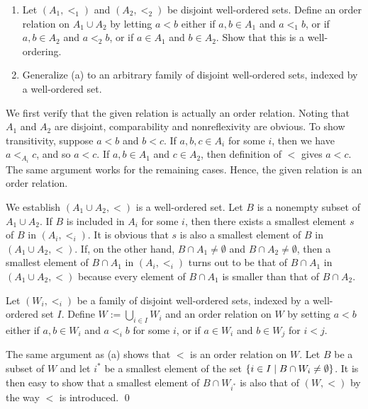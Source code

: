 \documentclass[a4paper,12pt]{article}
\begin{document}
\begin{exe}\leavevmode
	\begin{enumerate}
		\item
		      Let \( (A_1,<_{1}) \) and \( (A_2,<_2) \) be disjoint well-ordered sets.
		      Define an order relation on \( A_1 \cup A_2 \) by letting
		      \( a<b \)
		      either if \( a,b \in A_1 \)
		      and \( a<_1 b \),
		      or if \( a,b \in A_2 \)
		      and \( a<_2 b \),
		      or if \( a \in A_1 \) and \( b \in A_2 \).
		      Show that this is a well-ordering.
		      
		\item
		      Generalize (a) to an arbitrary family of disjoint well-ordered sets, indexed by a well-ordered set.
	\end{enumerate}
	
	
\end{exe}
\begin{sol}\leavevmode \par
	We first verify that the given relation is actually an order relation.
	Noting that \( A_1 \) and \( A_2 \) are disjoint,
	comparability and nonreflexivity are obvious.
	To show transitivity,
	suppose \( a<b \) and \( b<c \).
	If \( a,b,c \in A_i \) for some \( i \),
	then we have \( a<_{A_i} c \), and so \( a<c \).
	If \( a,b \in A_1 \) and \( c \in A_2 \),
	then definition of \( < \) gives \( a<c \).
	The same argument works for the remaining cases.
	Hence, the given relation is an order relation.
	
	We establish \( (A_1\cup A_2, <) \) is a well-ordered set.
	Let \( B \) is a nonempty subset of \( A_1\cup A_2 \).
	If \( B \) is included in \( A_i \) for some \( i \),
	then there exists a smallest element \( s \) of \( B \) in \( (A_i, <_i) \).
	It is obvious that \( s \) is also a smallest element of \( B \)
	in \( (A_1\cup A_2, <) \).
	If, on the other hand, \( B \cap A_1 \neq \emptyset \) and \( B \cap A_2 \neq \emptyset \),
	then a smallest element of \( B \cap A_1 \) in \( (A_i, <_i) \)
	turns out to be that of \( B \cap A_1 \) in \( (A_1\cup A_2, <) \)
	because every element of \( B \cap A_1 \) is smaller than that of \( B \cap A_2 \).
	
	Let \( (W_i, <_i) \) be a family of disjoint well-ordered sets, indexed by a well-ordered set \( I \).
	Define \( W:=\bigcup_{i \in I}W_i \)
	and an order relation on \( W \)
	by setting 
	\( a<b \)
	either if
	\( a,b \in W_i \)
	and
	\( a<_i b \)
	for some \( i \),
	or if
	\( a \in W_i \)
	and
	\( b \in W_j \)
	for \( i<j \).
	
	The same argument as (a) shows that \( < \) is an order relation on \( W \).
	Let \( B \) be a subset of \( W \) and let \( i^{\ast} \) be a smallest element of the set \( \left\{ i \in I \;|\; B \cap W_i \neq \emptyset \right\} \).
	It is then easy to show that a smallest element of \( B \cap W_{ i^{\ast}} \)
	is also that of \( (W,<) \) by the way \( < \) is introduced.
	\qed\end{sol}
\end{document}
